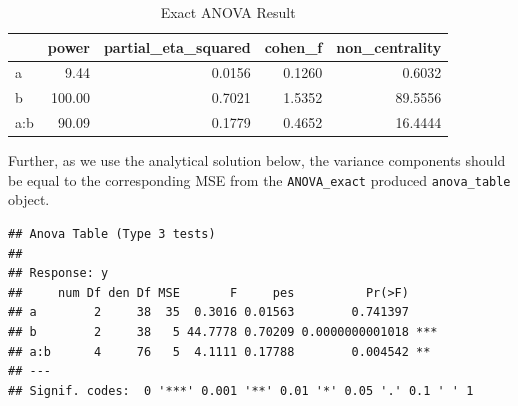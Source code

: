 \documentclass[]{book}
\newenvironment{Shaded}{\begin{snugshade}}{\end{snugshade}}
\newcommand{\NormalTok}[1]{#1}
\newcommand{\OperatorTok}[1]{\textcolor[rgb]{0.81,0.36,0.00}{\textbf{#1}}}
\begin{document}
\begin{table}[!h]

\caption{\label{tab:unnamed-chunk-166}Exact ANOVA Result}
\centering
\begin{tabular}{l|r|r|r|r}
\hline
  & power & partial\_eta\_squared & cohen\_f & non\_centrality\\
\hline
a & 9.44 & 0.0156 & 0.1260 & 0.6032\\
\hline
b & 100.00 & 0.7021 & 1.5352 & 89.5556\\
\hline
a:b & 90.09 & 0.1779 & 0.4652 & 16.4444\\
\hline
\end{tabular}
\end{table}

Further, as we use the analytical solution below, the variance components should be equal to the corresponding MSE from the \texttt{ANOVA\_exact} produced \texttt{anova\_table} object.

\begin{Shaded}
\end{Shaded}

\begin{verbatim}
## Anova Table (Type 3 tests)
## 
## Response: y
##     num Df den Df MSE       F     pes          Pr(>F)    
## a        2     38  35  0.3016 0.01563        0.741397    
## b        2     38   5 44.7778 0.70209 0.0000000001018 ***
## a:b      4     76   5  4.1111 0.17788        0.004542 ** 
## ---
## Signif. codes:  0 '***' 0.001 '**' 0.01 '*' 0.05 '.' 0.1 ' ' 1
\end{verbatim}
\end{document}
